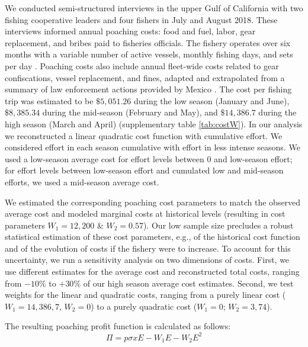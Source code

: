 We conducted semi-structured interviews in the upper Gulf of California with two fishing cooperative leaders and four fishers in July and August 2018. These interviews informed annual poaching costs: food and fuel, labor, gear replacement, and bribes paid to fisheries officials. The fishery operates over six months with a variable number of active vessels, monthly fishing days, and sets per day \citep{cisneros-mata_evaluacion_2020}. Poaching costs also include annual fleet-wide costs related to gear confiscations, vessel replacement, and fines, adapted and extrapolated from a summary of law enforcement actions provided by Mexico \citep{noauthor_species_2018}. The cost per fishing trip was estimated to be $\$5,051.26$ during the low season (January and June), $\$8,385.34$ during the mid-season (February and May), and $\$14,386.7$ during the high season (March and April) (supplementary table \ref{tab:costW}). In our analysis we reconstructed a linear quadratic cost function with cumulative effort. We considered effort in each season cumulative with effort in less intense seasons. We used a low-season average cost for effort levels between 0 and low-season effort; for effort levels between low-season effort and cumulated low and mid-season efforts, we used a mid-season average cost.

We estimated the corresponding poaching cost parameters to match the observed average cost and modeled marginal costs at historical levels (resulting in cost parameters $W_1 = 12,200$ \& $W_2 = 0.57$). Our low sample size precludes a robust statistical estimation of these cost parameters, e.g., of the historical cost function and of the evolution of costs if the fishery were to increase. To account for this uncertainty, we run a sensitivity analysis on two dimensions of costs. First, we use different estimates for the average cost and reconstructed total costs, ranging from $-10\%$ to $+30\%$ of our high season average cost estimates. Second, we test weights for the linear and quadratic costs, ranging from a purely linear cost ($W_1 = 14,386,7$, $W_2 = 0$) to a purely quadratic cost ($W_1 = 0$; $W_2 = 3,74$).
 
The resulting poaching profit function is calculated as follows:
\begin{equation}
\Pi = p\sigma x E - W_1E - W_2E^2
\end{equation}

